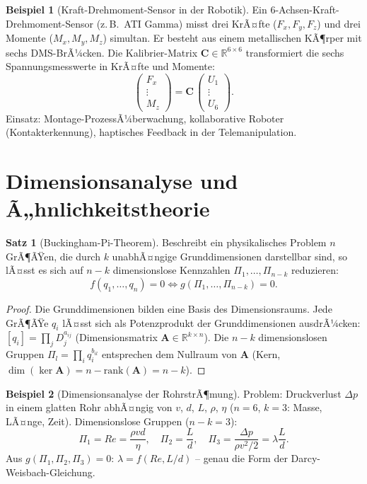 ﻿\documentclass[a4paper,12pt]{report}
\theoremstyle{definition}
\newtheorem{beispiel}{Beispiel}
\newtheorem{satz}{Satz}
\begin{document}
\begin{beispiel}[Kraft-Drehmoment-Sensor in der Robotik]
Ein 6-Achsen-Kraft-Drehmoment-Sensor (z.\,B.\ ATI Gamma) misst
drei KrÃ¤fte ($F_x, F_y, F_z$) und drei Momente ($M_x, M_y, M_z$) simultan.
Er besteht aus einem metallischen KÃ¶rper mit sechs DMS-BrÃ¼cken.
Die Kalibrier-Matrix $\mathbf{C} \in \mathbb{R}^{6\times6}$
transformiert die sechs Spannungsmesswerte in KrÃ¤fte und Momente:
\[
  \begin{pmatrix}F_x\\ \vdots \\ M_z\end{pmatrix} = \mathbf{C}\,\begin{pmatrix}U_1\\ \vdots \\ U_6\end{pmatrix}.
\]
Einsatz: Montage-ProzessÃ¼berwachung, kollaborative Roboter
(Kontakterkennung), haptisches Feedback in der Telemanipulation.
\end{beispiel}


\section{Dimensionsanalyse und Ã„hnlichkeitstheorie}

\begin{satz}[Buckingham-Pi-Theorem]
Beschreibt ein physikalisches Problem $n$ GrÃ¶ÃŸen, die durch $k$
unabhÃ¤ngige Grunddimensionen darstellbar sind, so lÃ¤sst es sich auf
$n - k$ dimensionslose Kennzahlen $\Pi_1, \ldots, \Pi_{n-k}$ reduzieren:
\[
  f(q_1, \ldots, q_n) = 0 \iff g(\Pi_1, \ldots, \Pi_{n-k}) = 0.
\]
\end{satz}
\begin{proof}
Die Grunddimensionen bilden eine Basis des Dimensionsraums.
Jede GrÃ¶ÃŸe $q_i$ lÃ¤sst sich als Potenzprodukt der Grunddimensionen
ausdrÃ¼cken: $[q_i] = \prod_j D_j^{a_{ij}}$ (Dimensionsmatrix $\mathbf{A} \in \mathbb{R}^{k\times n}$).
Die $n-k$ dimensionslosen Gruppen $\Pi_l = \prod_i q_i^{b_{il}}$ entsprechen
dem Nullraum von $\mathbf{A}$ (Kern, $\dim(\ker\mathbf{A}) = n - \mathrm{rank}(\mathbf{A}) = n-k$).
\end{proof}

\begin{beispiel}[Dimensionsanalyse der RohrstrÃ¶mung]
Problem: Druckverlust $\Delta p$ in einem glatten Rohr abhÃ¤ngig von
$v$, $d$, $L$, $\rho$, $\eta$ ($n=6$, $k=3$: Masse, LÃ¤nge, Zeit).
Dimensionslose Gruppen ($n-k=3$):
\[
  \Pi_1 = Re = \frac{\rho v d}{\eta}, \quad
  \Pi_2 = \frac{L}{d}, \quad
  \Pi_3 = \frac{\Delta p}{\rho v^2/2} = \lambda\frac{L}{d}.
\]
Aus $g(\Pi_1,\Pi_2,\Pi_3) = 0$: $\lambda = f(Re, L/d)$
-- genau die Form der Darcy-Weisbach-Gleichung.
\end{beispiel}
\end{document}
